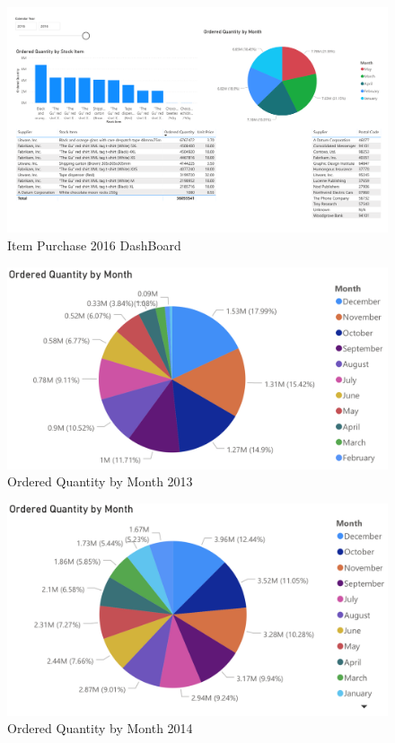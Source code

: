 \documentclass[12pt]{article}
\begin{document}
\begin{figure}[H]
    \centering
    \includegraphics[width=18.5cm, angle=90]
    {images/item Purchase2016.pdf}
    \caption{Item Purchase 2016 DashBoard}
    \label{Item Purchase 2016 DashBoard}
\end{figure}

\begin{figure}[H]
    \centering
    \includegraphics [width=17.5cm]
    {images/Purchases/Ordered Quantity by Month2013.png}
    \caption{Ordered Quantity by Month 2013}
    \label{Ordered Quantity by Month 2013}
\end{figure}

\begin{figure}[H]
    \centering
    \includegraphics [width=17.5cm]
    {images/Purchases/Ordered Quantity by Month2014.png}
    \caption{Ordered Quantity by Month 2014}
    \label{Ordered Quantity by Month 2014}
\end{figure}
\end{document}

